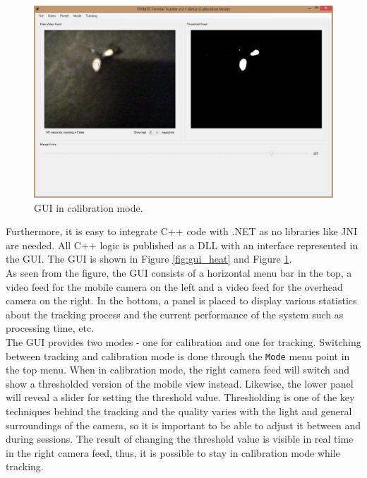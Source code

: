\begin{figure}[ht!]
  \centering
    \includegraphics[scale=0.35]{img/GUI_calib}
  \caption{GUI in calibration mode.}
  \label{fig:gui_thresh}
\end{figure}

Furthermore, it is easy to integrate C++ code with .NET as no libraries like JNI are needed. All C++ logic is published as a DLL with an interface represented in the GUI. The GUI is shown in Figure \ref{fig:gui_heat} and Figure \ref{fig:gui_thresh}. \\

As seen from the figure, the GUI consists of a horizontal menu bar in the top, a video feed for the mobile camera on the left and a video feed for the overhead camera on the right. In the bottom, a panel is placed to display various statistics about the tracking process and the current performance of the system such as processing time, etc. \\

The GUI provides two modes - one for calibration and one for tracking. Switching between tracking and calibration mode is done through the \texttt{Mode} menu point in the top menu. When in calibration mode, the right camera feed will switch and show a thresholded version of the mobile view instead. Likewise, the lower panel will reveal a slider for setting the threshold value. Thresholding is one of the key techniques behind the tracking and the quality varies with the light and general surroundings of the camera, so it is important to be able to adjust it between and during sessions. The result of changing the threshold value is visible in real time in the right camera feed, thus, it is possible to stay in calibration mode while tracking. \\

